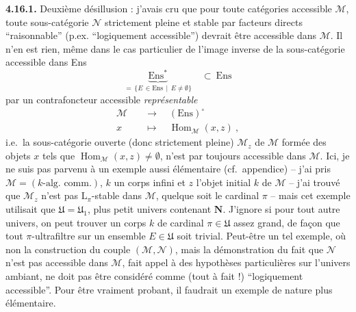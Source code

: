 \documentclass[11pt]{article}
\newcommand{\msp}[1]{\marginpar{\footnotesize [#1]}}
\newcommand{\Hom}{\operatorname{Hom}}
\newcommand{\Ens}{\mathrm{Ens}}
\begin{document}
\textbf{4.16.1.} Deuxième désillusion : j'avais cru que pour toute catégories accessible $\mathcal{M}$, toute %
sous-catégorie $\mathcal{N}$ strictement pleine et stable par facteurs directs “raisonnable” (p.ex. “logiquement accessible”) devrait être accessible dans $\mathcal{M}$. Il n'en est rien, même dans le cas particulier de l'image inverse de la sous-catégorie accessible dans Ens
\msp{465}
\[
\underbrace{\Ens^*}_{=\,\{E\,\in\Ens\,\mid\, E\neq\emptyset\}} \quad\subset\ \Ens
\]
par un contrafoncteur accessible \textit{représentable}
\[
\begin{aligned}
\mathcal{M} \quad &\longrightarrow \quad (\Ens)^\circ \\
x \quad &\longmapsto \quad \Hom_{\mathcal{M}}(x,z)\ ,
\end{aligned}
\]
i.e.\ la sous-catégorie ouverte (donc strictement pleine) $\mathcal{M}_z$ de $\mathcal{M}$ formée des objets $x$ tels que $\Hom_{\mathcal{M}}(x,z) \neq \emptyset$, n'est par toujours accessible dans $\mathcal{M}$. Ici, je ne suis pas parvenu à %
un exemple aussi élémentaire (cf.\ appendice) -- j'ai pris $\mathcal{M} = (k\text{-alg.\ comm.})$, $k$ un corps infini et $z$ l'objet initial $k$ de $\mathcal{M}$ -- j'ai trouvé que $\mathcal{M}_z$ n'est pas $\mathrm{L}_\pi$-stable dans $\mathcal{M}$, quelque soit le cardinal $\pi$ %
-- mais cet exemple utilisait que $\mathfrak{U} = \mathfrak{U}_1$, plus petit univers contenant $\mathbf{N}$. J'ignore si pour tout autre univers, on peut trouver un corps $k$ de cardinal $\pi \in \mathfrak{U}$ assez grand, de façon que tout $\pi$-ultrafiltre sur un ensemble $E \in \mathfrak{U}$ soit trivial. Peut-être
\msp{466}
un tel exemple, où non la construction du couple $(\mathcal{M},\mathcal{N})$, mais la démonstration du fait que $\mathcal{N}$ n'est pas accessible dans $\mathcal{M}$, fait appel à des hypothèses particulières sur l'univers ambiant, ne doit pas être considéré comme (tout à fait !) “logiquement accessible”. Pour être vraiment probant, il faudrait un exemple de nature plus élémentaire.
\end{document}
